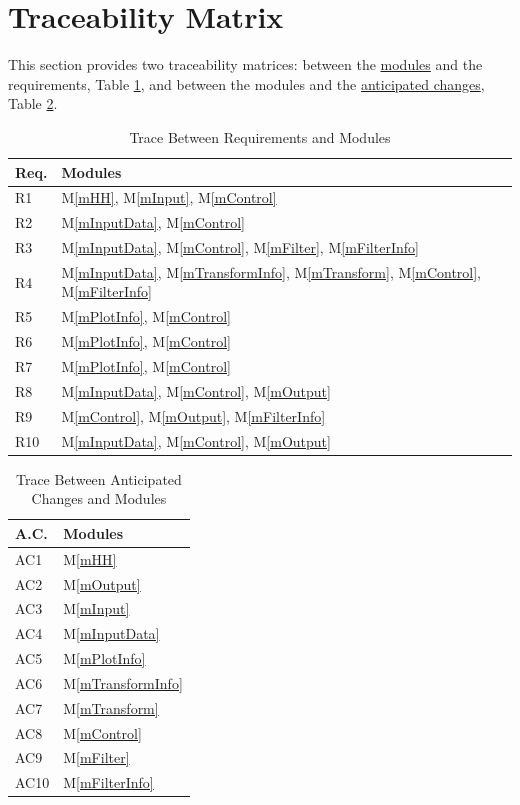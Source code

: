 \documentclass[12pt]{article}
\newcommand{\mref}[1]{M\ref{#1}}
\begin{document}
\section{Traceability Matrix} \label{SecTM}

This section provides two traceability matrices: between the \hyperref[SecMH]{modules} and the
requirements, Table \ref{TblRT}, and between the modules and the
 \hyperref[SecAchange]{anticipated changes}, Table \ref{TblAC}.

\begin{table}[h!]
\centering
\caption{Trace Between Requirements and Modules}
\begin{tabular}{p{} p{}}
\toprule
\textbf{Req.} & \textbf{Modules}\\
\midrule
R1 & \mref{mHH}, \mref{mInput}, \mref{mControl}\\
R2 & \mref{mInputData}, \mref{mControl}\\
R3 & \mref{mInputData}, \mref{mControl}, \mref{mFilter}, \mref{mFilterInfo}\\
R4 & 
\mref{mInputData}, \mref{mTransformInfo}, \mref{mTransform}, \mref{mControl},
\mref{mFilterInfo}\\
R5 & \mref{mPlotInfo}, \mref{mControl}\\
R6 & \mref{mPlotInfo}, \mref{mControl}\\
R7 & \mref{mPlotInfo}, \mref{mControl}\\
 R8 & \mref{mInputData}, \mref{mControl}, \mref{mOutput}\\
 R9 & \mref{mControl}, \mref{mOutput}, \mref{mFilterInfo}\\
 R10 & \mref{mInputData}, \mref{mControl}, \mref{mOutput}\\
\bottomrule
\end{tabular}
\label{TblRT}
\end{table}

\begin{table}[h!]
\centering
\caption{Trace Between Anticipated Changes and Modules}
\begin{tabular}{p{} p{}}
\toprule
\textbf{A.C.} & \textbf{Modules}\\
\midrule
AC1 & \mref{mHH}\\
AC2 & \mref{mOutput}\\
AC3 & \mref{mInput}\\
AC4 & \mref{mInputData}\\ 
AC5 & \mref{mPlotInfo}\\
AC6 & \mref{mTransformInfo}\\
AC7 & \mref{mTransform}\\
AC8& \mref{mControl}\\
AC9 & \mref{mFilter}\\
AC10 & \mref{mFilterInfo}\\ 
\bottomrule
\end{tabular}
\label{TblAC}
\end{table}
\end{document}
